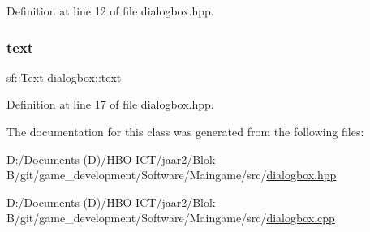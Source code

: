Definition at line 12 of file dialogbox.\+hpp.

\mbox{\label{classdialogbox_a710d3c7c4f21676a560d6825ff22a152}} 
\subsubsection{\texorpdfstring{text}{text}}
{\footnotesize\ttfamily sf\+::\+Text dialogbox\+::text}



Definition at line 17 of file dialogbox.\+hpp.



The documentation for this class was generated from the following files\+:\begin{DoxyCompactItemize}
\item 
D\+:/\+Documents-\/(\+D)/\+H\+B\+O-\/\+I\+C\+T/jaar2/\+Blok B/git/game\+\_\+development/\+Software/\+Maingame/src/\hyperlink{dialogbox_8hpp}{dialogbox.\+hpp}\item 
D\+:/\+Documents-\/(\+D)/\+H\+B\+O-\/\+I\+C\+T/jaar2/\+Blok B/git/game\+\_\+development/\+Software/\+Maingame/src/\hyperlink{dialogbox_8cpp}{dialogbox.\+cpp}\end{DoxyCompactItemize}
